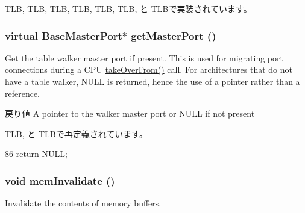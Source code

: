 \hyperlink{classAlphaISA_1_1TLB_aca1483a67aee5a91e442f7131d66bcbd}{TLB}, \hyperlink{classArmISA_1_1TLB_aca1483a67aee5a91e442f7131d66bcbd}{TLB}, \hyperlink{classMipsISA_1_1TLB_aca1483a67aee5a91e442f7131d66bcbd}{TLB}, \hyperlink{classMipsISA_1_1TLB_aca1483a67aee5a91e442f7131d66bcbd}{TLB}, \hyperlink{classPowerISA_1_1TLB_aca1483a67aee5a91e442f7131d66bcbd}{TLB}, \hyperlink{classSparcISA_1_1TLB_aca1483a67aee5a91e442f7131d66bcbd}{TLB}, と \hyperlink{classX86ISA_1_1TLB_aca1483a67aee5a91e442f7131d66bcbd}{TLB}で実装されています。\hypertarget{classBaseTLB_a5125451589673cb85c7cab06c2ac5434}{
\subsubsection[{getMasterPort}]{\setlength{\rightskip}{0pt plus 5cm}virtual {\bf BaseMasterPort}$\ast$ getMasterPort ()}}
\label{classBaseTLB_a5125451589673cb85c7cab06c2ac5434}
Get the table walker master port if present. This is used for migrating port connections during a CPU \hyperlink{classBaseTLB_abb09460e26e2667f44dad5f0679835e5}{takeOverFrom()} call. For architectures that do not have a table walker, NULL is returned, hence the use of a pointer rather than a reference.

\begin{DoxyReturn}{戻り値}
A pointer to the walker master port or NULL if not present 
\end{DoxyReturn}


\hyperlink{classArmISA_1_1TLB_a2ea87b216b1f58953a679590672be258}{TLB}, と \hyperlink{classX86ISA_1_1TLB_a2ea87b216b1f58953a679590672be258}{TLB}で再定義されています。


\begin{DoxyCode}
86 { return NULL; }
\end{DoxyCode}
\hypertarget{classBaseTLB_afea64b0aa579c17485db54c6a5c2ede3}{
\subsubsection[{memInvalidate}]{\setlength{\rightskip}{0pt plus 5cm}void memInvalidate ()}}
\label{classBaseTLB_afea64b0aa579c17485db54c6a5c2ede3}
Invalidate the contents of memory buffers.

